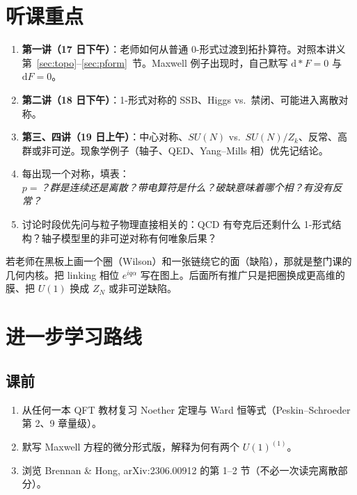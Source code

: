 \documentclass[11pt,a4paper]{article}
\theoremstyle{definition}
\theoremstyle{plain}
\theoremstyle{remark}
\newcommand{\dd}{\mathrm{d}}
\begin{document}
\section{听课重点}
\label{sec:listen}

\begin{enumerate}[leftmargin=1.8em]
  \item \textbf{第一讲（17 日下午）}：老师如何从普通 $0$-形式过渡到拓扑算符。对照本讲义第~\ref{sec:topo}--\ref{sec:pform}~节。Maxwell 例子出现时，自己默写 $\dd{*}F=0$ 与 $\dd F=0$。
  \item \textbf{第二讲（18 日下午）}：1-形式对称的 SSB、Higgs vs.\ 禁闭、可能进入离散对称。
  \item \textbf{第三、四讲（19 日上午）}：中心对称、$SU(N)$ vs.\ $SU(N)/Z_k$、反常、高群或非可逆。现象学例子（轴子、QED、Yang--Mills 相）优先记结论。
  \item 每出现一个对称，填表：\\
  \emph{$p=$？群是连续还是离散？带电算符是什么？破缺意味着哪个相？有没有反常？}
  \item 讨论时段优先问与粒子物理直接相关的：QCD 有夸克后还剩什么 1-形式结构？轴子模型里的非可逆对称有何唯象后果？
\end{enumerate}

\begin{hearbox}
若老师在黑板上画一个圈（Wilson）和一张链绕它的面（缺陷），那就是整门课的几何内核。把 linking 相位 $e^{iq\alpha}$ 写在图上。后面所有推广只是把圈换成更高维的膜、把 $U(1)$ 换成 $Z_N$ 或非可逆缺陷。
\end{hearbox}

\section{进一步学习路线}
\label{sec:next}

\subsection{课前}

\begin{enumerate}[leftmargin=1.6em]
  \item 从任何一本 QFT 教材复习 Noether 定理与 Ward 恒等式（Peskin--Schroeder 第 2、9 章量级）。
  \item 默写 Maxwell 方程的微分形式版，解释为何有两个 $U(1)^{(1)}$。
  \item 浏览 Brennan \& Hong, arXiv:2306.00912 的第 1--2 节（不必一次读完离散部分）。
\end{enumerate}
\end{document}
